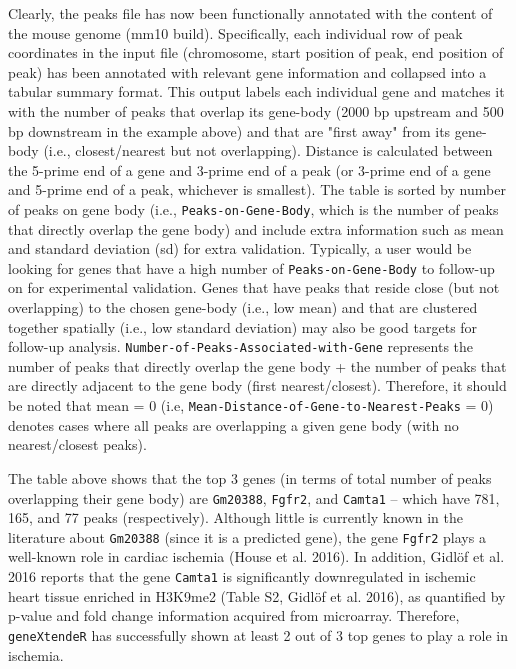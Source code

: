 \documentclass[12pt]{article}
\begin{document}
Clearly, the peaks file has now been functionally annotated with the content of the mouse genome (mm10 build).  Specifically, each individual row of peak coordinates in the input file (chromosome, start position of peak, end position of peak) has been annotated with relevant gene information and collapsed into a tabular summary format.  This output labels each individual gene and matches it with the number of peaks that overlap its gene-body (2000 bp upstream and 500 bp downstream in the example above) and that are "first away" from its gene-body (i.e., closest/nearest but not overlapping).  Distance is calculated between the 5-prime end of a gene and 3-prime end of a peak (or 3-prime end of a gene and 5-prime end of a peak, whichever is smallest).  The table is sorted by number of peaks on gene body (i.e., \texttt{Peaks-on-Gene-Body}, which is the number of peaks that directly overlap the gene body) and include extra information such as mean and standard deviation (sd) for extra validation.  Typically, a user would be looking for genes that have a high number of \texttt{Peaks-on-Gene-Body} to follow-up on for experimental validation. Genes that have peaks that reside close (but not overlapping) to the chosen gene-body (i.e., low mean) and that are clustered together spatially (i.e., low standard deviation) may also be good targets for follow-up analysis.  \texttt{Number-of-Peaks-Associated-with-Gene} represents the number of peaks that directly overlap the gene body + the number of peaks that are directly adjacent to the gene body (first nearest/closest).  Therefore, it should be noted that mean = 0 (i.e, \texttt{Mean-Distance-of-Gene-to-Nearest-Peaks} = 0) denotes cases where all peaks are overlapping a given gene body (with no nearest/closest peaks). 

The table above shows that the top 3 genes (in terms of total number of peaks overlapping their gene body) are \texttt{Gm20388}, \texttt{Fgfr2}, and \texttt{Camta1} -- which have 781, 165, and 77 peaks (respectively).  Although little is currently known in the literature about \texttt{Gm20388} (since it is a predicted gene), the gene \texttt{Fgfr2} plays a well-known role in cardiac ischemia (House et al. 2016).  In addition, Gidl\"{o}f et al. 2016 reports that the gene \texttt{Camta1} is significantly downregulated in ischemic heart tissue enriched in H3K9me2 (Table S2, Gidl\"{o}f et al. 2016), as quantified by p-value and fold change information acquired from microarray.  Therefore, \texttt{geneXtendeR} has successfully shown at least 2 out of 3 top genes to play a role in ischemia.    
\end{document}
